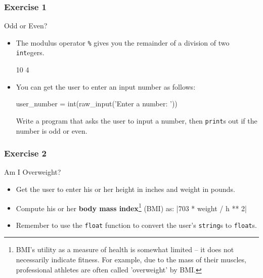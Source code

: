 \documentclass[10pt]{beamer}
\begin{document}
\begin{frame}[fragile]
  \frametitle{Exercise 1}
  \begin{block}{Odd or Even?}
    \begin{itemize}
      \item The modulus operator \texttt{\%} gives you the remainder of a division of two \texttt{int}egers.
        \begin{pythoncode}
  10 %
  4 %
        \end{pythoncode}

      \item You can get the user to enter an input number as follows:
        \begin{pythoncode}
  user_number = int(raw_input('Enter a number: '))
        \end{pythoncode}
        Write a program that asks the user to input a number, then \texttt{print}s out if the number is odd or even.
    \end{itemize}
  \end{block}
\end{frame}
    
\begin{frame}
  \frametitle{Exercise 2}
  \begin{block}{Am I Overweight?}
    \begin{itemize}
      \item Get the user to enter his or her height in inches and weight in pounds.
      \item Compute his or her \textbf{body mass index}\footnote{BMI's utility as a measure of health is somewhat limited -- it does not necessarily indicate fitness. For example, due to the mass of their muscles, professional athletes are often called 'overweight' by BMI.} (BMI) as: 
        |703 * weight / h ** 2|
      \item Remember to use the \texttt{float} function to convert the user's \texttt{string}s to \texttt{float}s.
    \end{itemize}
  \end{block}
\end{frame}
    
\end{document}
